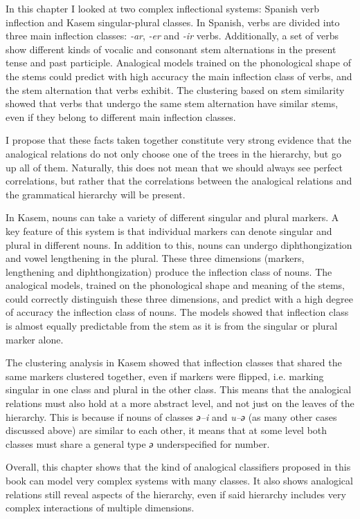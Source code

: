 In this chapter I looked at two complex inflectional systems: Spanish verb inflection and Kasem singular-plural classes. In Spanish, verbs are divided into three main inflection classes: \textit{-ar}, \textit{-er} and \textit{-ir} verbs. Additionally, a set of verbs show different kinds of vocalic and consonant stem alternations in the present tense and past participle. Analogical models trained on the phonological shape of the stems could predict with high accuracy the main inflection class of verbs, and the stem alternation that verbs exhibit. The clustering based on stem similarity showed that verbs that undergo the same stem alternation have similar stems, even if they belong to different main inflection classes.

I propose that these facts taken together constitute very strong evidence that the analogical relations do not only choose one of the trees in the hierarchy, but go up all of them. Naturally, this does not mean that we should always see perfect correlations, but rather that the correlations between the analogical relations and the grammatical hierarchy will be present.

In Kasem, nouns can take a variety of different singular and plural markers. A key feature of this system is that individual markers can denote singular and plural in different nouns. In addition to this, nouns can undergo diphthongization and vowel lengthening in the plural. These three dimensions (markers, lengthening and diphthongization) produce the inflection class of nouns. The analogical models, trained on the phonological shape and meaning of the stems, could correctly distinguish these three dimensions, and predict with a high degree of accuracy the inflection class of nouns. The models showed that inflection class is almost equally predictable from the stem as it is from the singular or plural marker alone.

The clustering analysis in Kasem showed that inflection classes that shared the same markers clustered together, even if markers were flipped, i.e. marking singular in one class and plural in the other class. This means that the analogical relations must also hold at a more abstract level, and not just on the leaves of the hierarchy. This is because if nouns of classes \textit{ә--i} and \textit{u--ә} (as many other cases discussed above) are similar to each other, it means that at some level both classes must share a general type \textit{ә} underspecified for number.

Overall, this chapter shows that the kind of analogical classifiers proposed in this book can model very complex systems with many classes. It also shows analogical relations still reveal aspects of the hierarchy, even if said hierarchy includes very complex interactions of multiple dimensions. 


